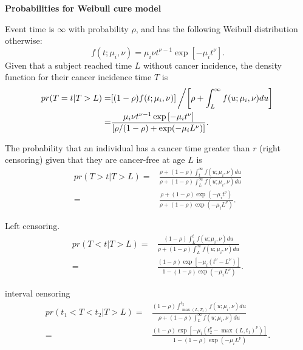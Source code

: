 \documentclass{article}
\begin{document}
{\bf Probabilities for Weibull cure model}

Event time is $\infty$ with probability $\rho$, and has the following Weibull distribution otherwise:
\[
f(t;\mu_i,\nu) =  \mu_i \nu t^{\nu-1} \exp\left[-   \mu_i t^\nu\right].
\] 
 Given that a subject reached time $L$ without cancer incidence, the density function for their cancer incidence time $T$ is
\begin{align*}
pr(T = t | T > L) =&  [(1-\rho) f(t;\mu_i, \nu)] \left/ \left[ \rho + \int_L^{\infty} f(u;\mu_i, \nu) du \right]\right. \\
=& \frac{\mu_i \nu t^{\nu-1} \exp\left[-\mu_it^\nu\right]}{\left[
\rho/(1-\rho)  + \exp(-\mu_i L^\nu) 
\right]}. 
\end{align*}

The probability that an individual has a cancer time greater than $r$ (right censoring) given that they are cancer-free at age $L$ is
\begin{align*}
pr(T > t | T > L) =&  \frac{\rho + (1-\rho)\int_t^\infty f(u;\mu_i, \nu) du }{ 
\rho + (1-\rho) \int_{L}^\infty f(u;\mu_i, \nu) du}\\
=& \frac{\rho + (1-\rho)  \exp(-\mu_i t^\nu)}{\rho + (1-\rho)  \exp(-\mu_i L^\nu)}.
\end{align*}


 Left censoring.
\begin{align*}
pr(T < t | T > L) =&  \frac{ (1- \rho) \int_L^t f(u;\mu_i, \nu) du }{ 
\rho + (1-\rho) \int_L^\infty f(u;\mu_i, \nu) du}\\
=& \frac{ (1 - \rho)   \exp[-\mu_i (t^\nu - L^\nu)]}{1 - (1-\rho) \exp(-\mu_i L^\nu)}.
\end{align*}

interval censoring
\begin{align*}
pr(t_1 < T < t_2 | T > L) =&  \frac{ (1- \rho) \int_{\max(L, T_1)}^{t_2} f(u;\mu_i, \nu) du }{ 
\rho + (1-\rho) \int_L^\infty f(u;\mu_i, \nu) du}\\
=& \frac{ (1 - \rho)   \exp[-\mu_i (t_2^\nu - \max(L, t_1)^\nu)]}{1 - (1-\rho) \exp(-\mu_i L^\nu)}.
\end{align*}
 
\end{document}
